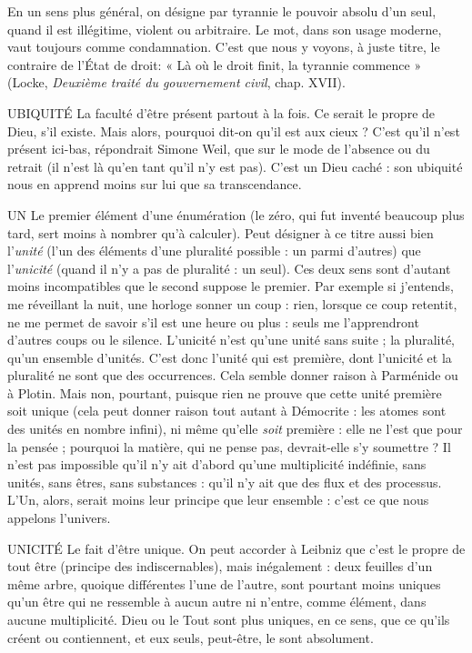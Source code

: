 En un sens plus général, on désigne par tyrannie le pouvoir absolu d’un
seul, quand il est illégitime, violent ou arbitraire. Le mot, dans son usage
moderne, vaut toujours comme condamnation. C’est que nous y voyons, à
juste titre, le contraire de l’État de droit: « Là où le droit finit, la tyrannie
commence » (Locke, {\it Deuxième traité du gouvernement civil}, chap. XVII).

UBIQUITÉ La faculté d’être présent partout à la fois. Ce serait le propre de
Dieu, s’il existe. Mais alors, pourquoi dit-on qu’il est aux
cieux ? C’est qu’il n’est présent ici-bas, répondrait Simone Weil, que sur le
mode de l'absence ou du retrait (il n’est là qu’en tant qu’il n’y est pas). C’est un
Dieu caché : son ubiquité nous en apprend moins sur lui que sa transcendance.

UN Le premier élément d’une énumération (le zéro, qui fut inventé beaucoup
plus tard, sert moins à nombrer qu’à calculer). Peut désigner à ce
titre aussi bien l’{\it unité} (l’un des éléments d’une pluralité possible : un parmi
d’autres) que l’{\it unicité} (quand il n’y a pas de pluralité : un seul). Ces deux
sens sont d’autant moins incompatibles que le second suppose le premier.
Par exemple si j'entends, me réveillant la nuit, une horloge sonner un coup :
rien, lorsque ce coup retentit, ne me permet de savoir s’il est une heure ou
plus : seuls me l’apprendront d’autres coups ou le silence. L’unicité n’est
qu’une unité sans suite ; la pluralité, qu’un ensemble d’unités. C’est donc
l'unité qui est première, dont l’unicité et la pluralité ne sont que des occurrences.
Cela semble donner raison à Parménide ou à Plotin. Mais non, pourtant,
puisque rien ne prouve que cette unité première soit unique (cela peut
donner raison tout autant à Démocrite : les atomes sont des unités en
nombre infini), ni même qu’elle {\it soit} première : elle ne l’est que pour la
pensée ; pourquoi la matière, qui ne pense pas, devrait-elle s’y soumettre ? Il
n’est pas impossible qu’il n’y ait d’abord qu’une multiplicité indéfinie, sans
unités, sans êtres, sans substances : qu’il n’y ait que des flux et des processus.
L'Un, alors, serait moins leur principe que leur ensemble : c’est ce que nous
appelons l’univers.

UNICITÉ Le fait d’être unique. On peut accorder à Leibniz que c’est le
propre de tout être (principe des indiscernables), mais inégalement :
deux feuilles d’un même arbre, quoique différentes l’une de l’autre, sont
pourtant moins uniques qu'un être qui ne ressemble à aucun autre ni n’entre,
comme élément, dans aucune multiplicité. Dieu ou le Tout sont plus uniques,
en ce sens, que ce qu'ils créent ou contiennent, et eux seuls, peut-être, le sont
absolument.


